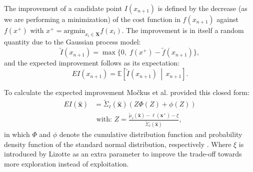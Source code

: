 The improvement of a candidate point $I(x_{n+1})$ is defined by the decrease (as we are performing a minimization) of the cost function in $f(x_{n+1})$ against $f(x^{+})$ with $x^+ = \text{argmin}_{x_i \in \boldsymbol{X}} f(x_i)$. The improvement is in itself a random quantity due to the Gaussian process model: 
\begin{equation}\label{eq::improvement}
    \tilde{I}(x_{n+1}) = \max\{0,\; f(x^+) - \tilde{f}(x_{n+1}) \},
\end{equation}
and the expected improvement follows as its expectation:
\begin{equation}
    EI(x_{n+1}) = \mathbb{E}\left[\tilde{I}(x_{n+1}) \,\middle|\, x_{n+1} \right].
\end{equation}

To calculate the expected improvement Močkus et al. provided this closed form:
\begin{equation}\label{eq::EI}
\begin{array}{ll}
E I(\hat{\mathbf{x}}) & =\tilde{\Sigma}_{\ell}(\hat{\mathbf{x}})(Z \Phi(Z)+\phi(Z)) \\
& \text { with: } Z=\frac{\tilde{\mu}_{\ell}(\hat{\mathbf{x}})-\ell\left(\mathbf{x}^{+}\right) - \xi}{\tilde{\Sigma}_{\ell}(\hat{\mathbf{x}})},
\end{array}
\end{equation}
in which $\Phi$ and $\phi$ denote the cumulative distribution function and probability density function of the standard normal distribution, respectively \cite{gardner2014bayesian}. Where $\xi$ is introduced by Lizotte \cite{Lizotte2008} as an extra parameter to improve the trade-off towards more exploration instead of exploitation. 

